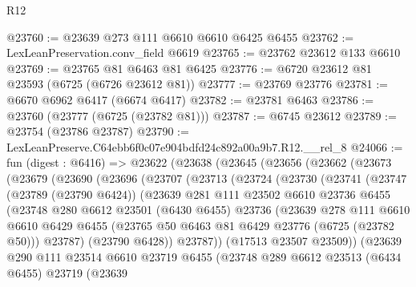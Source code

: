\begin{lexlean}{R12}
\begin{coremodule}
@23760 := @23639 @273 @111 @6610 @6610 @6425 @6455
@23762 := LexLeanPreservation.conv_field @6619
@23765 := @23762 @23612 @133 @6610
@23769 := @23765 @81 @6463 @81 @6425
@23776 := @6720 @23612 @81 @23593 (@6725 (@6726 @23612 @81))
@23777 := @23769 @23776
@23781 := @6670 @6962 @6417 (@6674 @6417)
@23782 := @23781 @6463
@23786 := @23760 (@23777 (@6725 (@23782 @81)))
@23787 := @6745 @23612
@23789 := @23754 (@23786 @23787)
@23790 := LexLeanPreserve.C64ebb6f0c07e904bdfd24c892a00a9b7.R12.__rel_8
@24066 := fun (digest : @6416) =>
  @23622
    (@23638
      (@23645
        (@23656
          (@23662
            (@23673
              (@23679
                (@23690
                  (@23696
                    (@23707
                      (@23713
                        (@23724
                          (@23730
                            (@23741
                              (@23747
                                (@23789 (@23790 @6424))
                                (@23639
                                  @281
                                  @111
                                  @23502
                                  @6610
                                  @23736
                                  @6455
                                  (@23748
                                    @280
                                    @6612
                                    @23501
                                    (@6430 @6455)
                                    @23736
                                    (@23639
                                      @278
                                      @111
                                      @6610
                                      @6610
                                      @6429
                                      @6455
                                      (@23765 @50 @6463 @81 @6429 @23776 (@6725 (@23782 @50)))
                                      @23787)
                                    (@23790 @6428))
                                  @23787))
                              (@17513 @23507 @23509))
                            (@23639
                              @290
                              @111
                              @23514
                              @6610
                              @23719
                              @6455
                              (@23748
                                @289
                                @6612
                                @23513
                                (@6434 @6455)
                                @23719
                                (@23639

\end{coremodule}
\end{lexlean}
